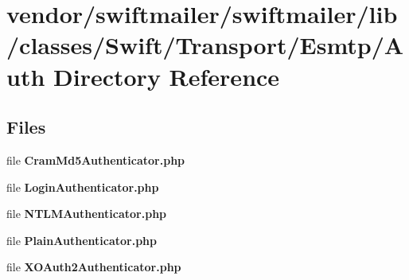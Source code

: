 \section{vendor/swiftmailer/swiftmailer/lib/classes/\+Swift/\+Transport/\+Esmtp/\+Auth Directory Reference}
\label{dir_bd2a83f774c5e078a178782ed6375ec1}
\subsection*{Files}
\begin{DoxyCompactItemize}
\item 
file {\bf Cram\+Md5\+Authenticator.\+php}
\item 
file {\bf Login\+Authenticator.\+php}
\item 
file {\bf N\+T\+L\+M\+Authenticator.\+php}
\item 
file {\bf Plain\+Authenticator.\+php}
\item 
file {\bf X\+O\+Auth2\+Authenticator.\+php}
\end{DoxyCompactItemize}
